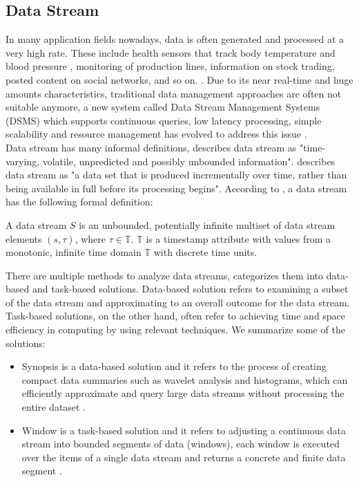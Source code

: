 \documentclass[runningheads]{llncs}
\begin{document}
\subsection{Data Stream}
In many application fields nowadays, data is often generated and processed at a very high rate. These include health sensors that track body temperature and blood pressure \cite{Geisler13},
monitoring of production lines, information on stock trading, posted content on social networks, and so on. \cite{Geisler16}. Due to its near real-time and huge amounts characteristics, traditional data management
approaches are often not suitable anymore, a new system called Data Stream Management Systems (DSMS) which supports continuous queries, low latency processing, simple scalability and resource management
 has evolved to address this issue \cite{Geisler16}. \\
\noindent \newline
Data stream has many informal definitions, \cite{Patro06} describes data stream as "time-varying, volatile, unpredicted and possibly unbounded information". \cite{Golab03} describes data stream as
"a data set that is produced incrementally over time, rather than being available in full before its processing begins". According to \cite{Geisler13}, a data stream has the following formal definition:
\begin{definition}
  A data stream $S$ is an unbounded, potentially infinite multiset of data stream elements $(s,\tau)$, where $\tau \in \mathbb{T}$. $\mathbb{T}$ is a timestamp attribute with values from a monotonic, infinite time domain $\mathbb{T}$ with discrete time units.
\end{definition} 
\noindent
There are multiple methods to analyze data streams, \cite{Gaber05} categorizes them into data-based and task-based solutions. Data-based solution refers to examining a subset of the data stream and approximating to an
overall outcome for the data stream. Task-based solutions, on the other hand, often refer to achieving time and space efficiency in computing by using relevant techniques. We summarize some of the solutions:
\begin{itemize}
  \item Synopsis is a data-based solution and it refers to the process of creating compact data summaries such as wavelet analysis and histograms, which can efficiently approximate and query large data streams without processing the entire dataset \cite{Gaber05}.
  \item Window is a task-based solution and it refers to adjusting a continuous data stream into bounded segments of data (windows), each window is executed over the items of a single data stream and returns a concrete and finite data segment \cite{Patro06}.
\end{itemize}
\end{document}
